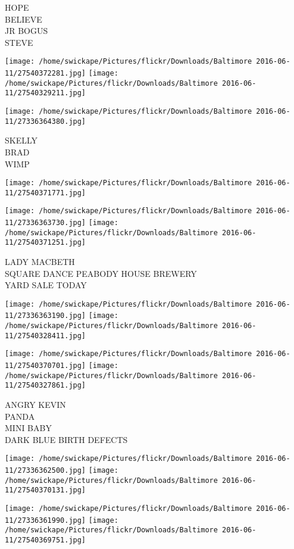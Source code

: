 \documentclass[10pt,letterpaper]{article}
\begin{document}
HOPE\\
BELIEVE\\
JR BOGUS\\
STEVE
\pagebreak

\texttt{[image: /home/swickape/Pictures/flickr/Downloads/Baltimore 2016-06-11/27540372281.jpg]}
\texttt{[image: /home/swickape/Pictures/flickr/Downloads/Baltimore 2016-06-11/27540329211.jpg]}

\texttt{[image: /home/swickape/Pictures/flickr/Downloads/Baltimore 2016-06-11/27336364380.jpg]}

SKELLY\\
BRAD\\
WIMP
\pagebreak

\texttt{[image: /home/swickape/Pictures/flickr/Downloads/Baltimore 2016-06-11/27540371771.jpg]}

\vspace{0.25in}
\texttt{[image: /home/swickape/Pictures/flickr/Downloads/Baltimore 2016-06-11/27336363730.jpg]}
\texttt{[image: /home/swickape/Pictures/flickr/Downloads/Baltimore 2016-06-11/27540371251.jpg]}

LADY MACBETH\\
SQUARE DANCE PEABODY HOUSE BREWERY\\
YARD SALE TODAY
\pagebreak

\texttt{[image: /home/swickape/Pictures/flickr/Downloads/Baltimore 2016-06-11/27336363190.jpg]}
\texttt{[image: /home/swickape/Pictures/flickr/Downloads/Baltimore 2016-06-11/27540328411.jpg]}

\texttt{[image: /home/swickape/Pictures/flickr/Downloads/Baltimore 2016-06-11/27540370701.jpg]}
\texttt{[image: /home/swickape/Pictures/flickr/Downloads/Baltimore 2016-06-11/27540327861.jpg]}

ANGRY KEVIN\\
PANDA\\
MINI BABY\\
DARK BLUE BIRTH DEFECTS
\pagebreak

\texttt{[image: /home/swickape/Pictures/flickr/Downloads/Baltimore 2016-06-11/27336362500.jpg]}
\texttt{[image: /home/swickape/Pictures/flickr/Downloads/Baltimore 2016-06-11/27540370131.jpg]}

\texttt{[image: /home/swickape/Pictures/flickr/Downloads/Baltimore 2016-06-11/27336361990.jpg]}
\texttt{[image: /home/swickape/Pictures/flickr/Downloads/Baltimore 2016-06-11/27540369751.jpg]}
\end{document}
